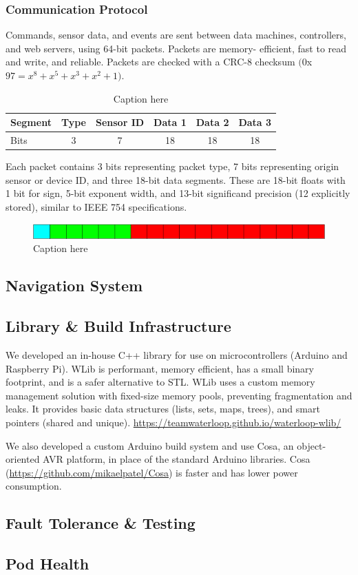 \documentclass[main.tex]{subfile}
\begin{document}
    \subsubsection{Communication Protocol}
    Commands, sensor data, and events are sent between data machines, controllers, and web servers, using 64-bit packets. Packets are memory-		efficient, fast to read and write, and reliable. Packets are checked with a CRC-8 checksum $(0$x$97 = x^8 + x^5 + x^3 + x^2 + 1)$.
    \begin{table}[H]
    	\centering
    	\begin{tabular}{@{}lccccc@{}} \toprule
            Segment & Type & Sensor ID & Data 1 & Data 2 & Data 3 \\ \midrule
            Bits & 3 & 7 & 18 & 18 & 18 \\ \bottomrule
        \end{tabular}
        \caption{Caption here}
    \end{table}
    Each packet contains 3 bits representing packet type, 7 bits representing origin sensor or device ID, and three 18-bit data segments. These are 18-bit floats with 1 bit for sign, 5-bit exponent width, and 13-bit significand precision (12 explicitly stored), similar to IEEE 754 specifications.
	\begin{figure}[H]
        \centering
        \includegraphics[width = \textwidth]{images/fig326}
    	\caption{Caption here}
    \end{figure}
    \subsection{Navigation System}
    \subsection{Library \& Build Infrastructure}
    We developed an in-house C++ library for use on microcontrollers (Arduino and Raspberry Pi). WLib is performant, memory efficient, has a small binary footprint, and is a safer alternative to STL. WLib uses a custom memory management solution with fixed-size memory pools, preventing fragmentation and leaks. It provides basic data structures (lists, sets, maps, trees), and smart pointers (shared and unique).
    \url{https://teamwaterloop.github.io/waterloop-wlib/}

    We also developed a custom Arduino build system and use Cosa, an object-oriented AVR platform, in place of the standard Arduino libraries. Cosa (\url{https://github.com/mikaelpatel/Cosa}) is faster and has lower power consumption.
    \subsection{Fault Tolerance \& Testing}
    \subsection{Pod Health}
\end{document}
